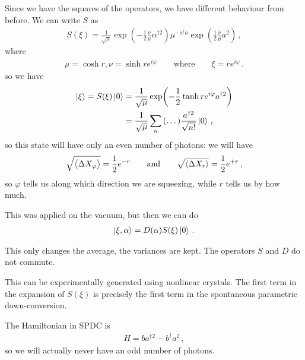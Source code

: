 \documentclass[main.tex]{subfiles}
\begin{document}
Since we have the squares of the operators, we have different behaviour from before. We can write \(S\) as  
%
\begin{align}
S(\xi ) = \frac{1}{\sqrt{\mu }} \exp( - \frac{1}{2} \frac{\nu }{\mu } \alpha ^{\dag 2}) \mu^{- a ^\dag a} \exp( \frac{1}{2} \frac{\overline{\nu}}{\mu } a^2)
\,,
\end{align}
%
where 
%
\begin{align}
\mu = \cosh r, \nu = \sinh r e^{i \varphi } \qquad \text{where} \qquad
\xi = r e^{i \varphi }
\,.
\end{align}
%
so we have 
%
\begin{align}
\ket{\xi } = S(\xi ) \ket{0} 
&= \frac{1}{\sqrt{\mu }} \exp(- \frac{1}{2} \tanh r e^{i \varphi } a ^{\dag 2})    \\
&= \frac{1}{\sqrt{\mu }} \sum _{n} \qty(\dots) \frac{a ^{\dag 2}}{\sqrt{n!}} \ket{0}
\,,
\end{align}
%
so this state will have only an even number of photons: we will have 
%
\begin{align}
\sqrt{\expval{\Delta X_{\varphi }}} = \frac{1}{2} e^{-r} \qquad \text{and} \qquad
\sqrt{\expval{\Delta X_{r}}} = \frac{1}{2} e^{+r}
\,,
\end{align}
%
so \(\varphi \) tells us along which direction we are squeezing, while \(r\) tells us by how much. 

This was applied on the vacuum, but then we can do 
%
\begin{align}
\ket{\xi , \alpha } = D(\alpha ) S( \xi ) \ket{0}
\,.
\end{align}

This only changes the average, the variances are kept. 
The operators \(S\) and \(D\) do not commute.

This can be experimentally generated using nonlinear crystals. 
The first term in the expansion of \(S(\xi )\) is precisely the first term in the spontaneous parametric down-conversion. 

The Hamiltonian in SPDC is 
%
\begin{align}
H = b a^{\dag 2} - b ^\dag a^2
\,,
\end{align}
%
so we will actually never have an odd number of photons. 
\end{document}
